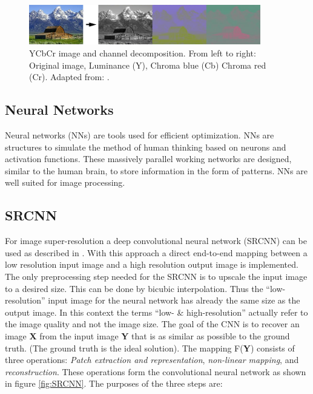 \documentclass[
			fontsize = 12pt,
			paper = a4
			]
			{scrartcl}%
\newcommand{\?}{\ensuremath{^\texttt{\textbf [CITATION~NEEDED]}}}
\begin{document}
\begin{figure}[H]
    \centering
    \includegraphics[width=0.9\textwidth]{fig/ycbcrhorizontal.png}
    \caption{YCbCr image and channel decomposition. From left to right: Original image, Luminance (Y), Chroma blue (Cb) Chroma red (Cr).  Adapted from: \cite{wiki:ycbcr}.}
    \label{fig:ycbcr}
\end{figure}


\subsection{Neural Networks}
\label{sec:NN}
Neural networks (NNs) are tools used for efficient optimization. NNs are structures to simulate the method of human thinking based on neurons and activation functions. These massively parallel working networks are designed, similar to the human brain, to store information in the form of patterns. NNs are well suited for image processing.

\subsection{SRCNN}
\label{sec:SRCNN}
For image super-resolution a deep convolutional neural network (SRCNN) can be used as described in \cite{}. With this approach a direct end-to-end mapping between a low resolution input image and a high resolution output image is implemented. The only preprocessing step needed for the SRCNN is to upscale the input image to a desired size. This can be done by bicubic interpolation. Thus the \enquote{low-resolution} input image for the neural network has already the same size as the output image. In this context the terms \enquote{low- \& high-resolution} actually refer to the image quality and not the image size. The goal of the CNN is to recover an image \textbf{X} from the input image \textbf{Y} that is as similar as possible to the ground truth. (The ground truth is the ideal solution). The mapping F(\textbf{Y}) consists of three operations: \textit{Patch extraction and representation}, \textit{non-linear mapping}, and \textit{reconstruction}. These operations form the convolutional neural network as shown in figure \ref{fig:SRCNN}. The purposes of the three steps are:
\end{document}
